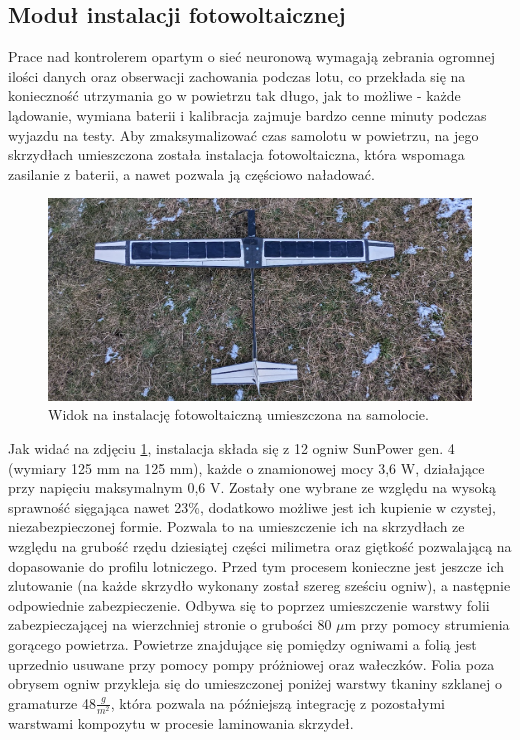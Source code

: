 \documentclass[12pt, a4paper]{article}
\begin{document}
 \FloatBarrier
\subsection{Moduł instalacji fotowoltaicznej}
Prace nad kontrolerem opartym o sieć neuronową wymagają zebrania ogromnej ilości danych oraz obserwacji zachowania podczas lotu, co przekłada się na konieczność utrzymania go w powietrzu tak długo, jak to możliwe - każde lądowanie, wymiana baterii i kalibracja zajmuje bardzo cenne minuty podczas wyjazdu na testy. Aby zmaksymalizować czas samolotu w powietrzu, na jego skrzydłach umieszczona została instalacja fotowoltaiczna, która wspomaga zasilanie z baterii, a nawet pozwala ją częściowo naładować.

\begin{figure}[ht]
    \centering
    \includegraphics[width=1\textwidth]{panelki}
    \caption{Widok na instalację fotowoltaiczną umieszczona na samolocie.}
    \label{fig:panelki}
\end{figure}

Jak widać na zdjęciu \ref{fig:panelki}, instalacja składa się z 12 ogniw SunPower gen. 4 (wymiary 125 mm na 125 mm), każde o znamionowej mocy 3,6 W, działające przy napięciu maksymalnym 0,6 V. Zostały one wybrane ze względu na wysoką sprawność sięgająca nawet 23\%,  dodatkowo możliwe jest ich kupienie w czystej, niezabezpieczonej formie. Pozwala to na umieszczenie ich na skrzydłach ze względu na grubość rzędu dziesiątej części milimetra oraz giętkość pozwalającą na dopasowanie do profilu lotniczego. Przed tym procesem konieczne jest jeszcze ich zlutowanie (na każde skrzydło wykonany został szereg sześciu ogniw), a następnie odpowiednie zabezpieczenie. Odbywa się to poprzez umieszczenie warstwy folii  zabezpieczającej na wierzchniej stronie o grubości 80 $\mu$m przy pomocy strumienia gorącego powietrza. Powietrze znajdujące się pomiędzy ogniwami a folią jest uprzednio usuwane przy pomocy pompy próżniowej oraz wałeczków. Folia poza obrysem ogniw przykleja się do umieszczonej poniżej warstwy tkaniny szklanej o gramaturze 48$\frac{g}{m^2}$, która pozwala na późniejszą integrację z pozostałymi warstwami kompozytu w procesie laminowania skrzydeł.
\end{document}

